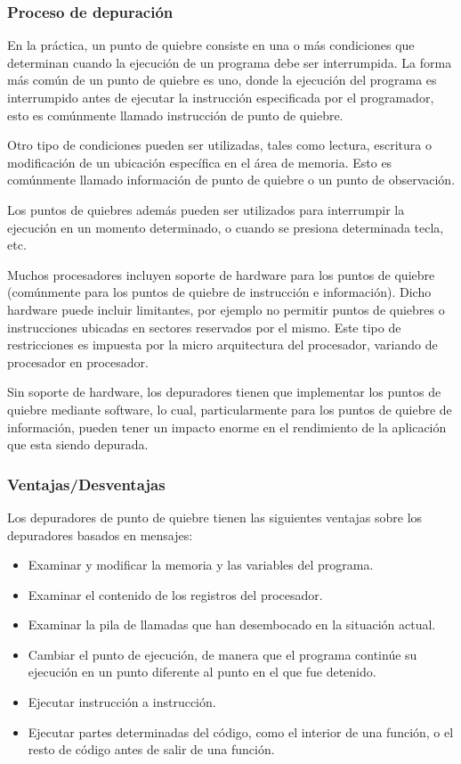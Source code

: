 \documentclass[12pt,legalpaper]{report}
\begin{document}
			\subsubsection{Proceso de depuración}

En la práctica, un punto de quiebre consiste en una o más condiciones que determinan cuando la ejecución de un programa debe ser interrumpida.  La forma más común de un punto de quiebre es uno, donde la ejecución del programa es interrumpido antes de ejecutar la instrucción especificada por el programador, esto es comúnmente llamado instrucción de punto de quiebre.

Otro tipo de condiciones pueden ser utilizadas, tales como lectura, escritura o modificación de un ubicación específica en el área de memoria.  Esto es comúnmente llamado información de punto de quiebre o un punto de observación.

Los puntos de quiebres además pueden ser utilizados para interrumpir la ejecución en un momento determinado, o cuando se presiona determinada tecla, etc.

Muchos procesadores incluyen soporte de hardware para los puntos de quiebre (comúnmente para los puntos de quiebre de instrucción e información).  Dicho hardware puede incluir limitantes, por ejemplo no permitir puntos de quiebres o instrucciones ubicadas en sectores reservados por el mismo.  Este tipo de restricciones es impuesta por la micro arquitectura del procesador, variando de procesador en procesador.

Sin soporte de hardware, los depuradores tienen que implementar los puntos de quiebre mediante software, lo cual, particularmente para los puntos de quiebre de información, pueden tener un impacto enorme en el rendimiento de la aplicación que esta siendo depurada.


			\subsubsection{Ventajas/Desventajas}
			
Los depuradores de punto de quiebre tienen las siguientes ventajas sobre los depuradores basados en mensajes:

\begin{itemize} 
	\item Examinar y modificar la memoria y las variables del programa.
	\item Examinar el contenido de los registros del procesador.
	\item Examinar la pila de llamadas que han desembocado en la situación actual.
	\item Cambiar el punto de ejecución, de manera que el programa continúe su ejecución en un punto diferente al punto en el que fue detenido.
	\item Ejecutar instrucción a instrucción.
	\item Ejecutar partes determinadas del código, como el interior de una función, o el resto de código antes de salir de una función.
\end{itemize}
\end{document}
